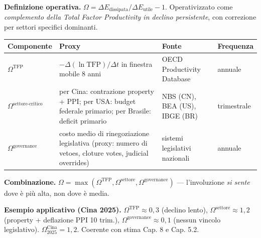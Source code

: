 \Hypoth{} \textbf{Definizione operativa.}
\(\Omega = \Delta E_{\text{dissipata}}/\Delta E_{\text{utile}} - 1\).
Operativizzato come \emph{complemento della Total Factor Productivity in
declino persistente}, con correzione per settori specifici dominanti.

{\def\LTcaptype{none} %
{\small\begin{longtable}[]{@{}
  >{\raggedright\arraybackslash}p{}
  >{\raggedright\arraybackslash}p{}
  >{\raggedright\arraybackslash}p{}
  >{\raggedright\arraybackslash}p{}@{}}
\toprule\noalign{}
\begin{minipage}[b]{\linewidth}\raggedright
Componente
\end{minipage} & \begin{minipage}[b]{\linewidth}\raggedright
Proxy
\end{minipage} & \begin{minipage}[b]{\linewidth}\raggedright
Fonte
\end{minipage} & \begin{minipage}[b]{\linewidth}\raggedright
Frequenza
\end{minipage} \\
\midrule\noalign{}
\endhead
\bottomrule\noalign{}
\endlastfoot
\(\Omega^{\text{TFP}}\) & \(-\Delta(\ln \text{TFP})/\Delta t\) in
finestra mobile 8 anni & OECD Productivity Database & annuale \\
\(\Omega^{\text{settore-critico}}\) & per Cina: contrazione property +
PPI; per USA: budget federale primario; per Brasile: deficit primario &
NBS (CN), BEA (US), IBGE (BR) & trimestrale \\
\(\Omega^{\text{governance}}\) & costo medio di rinegoziazione
legislativa (proxy: numero di vetoes, cloture votes, judicial overrides)
& sistemi legislativi nazionali & annuale \\
\end{longtable}}
}

\Proved{} \textbf{Combinazione.}
\(\Omega = \max(\Omega^{\text{TFP}}, \Omega^{\text{settore}}, \Omega^{\text{governance}})\)
--- l'involuzione \emph{si sente} dove è più alta, non dove è media.

\Hypoth{} \textbf{Esempio applicativo (Cina 2025).}
\(\Omega^{\text{TFP}} \approx 0{,}3\) (declino lento),
\(\Omega^{\text{settore}} \approx 1{,}2\) (property + deflazione PPI 10
trim.), \(\Omega^{\text{governance}} \approx 0{,}1\) (nessun vincolo
legislativo). \(\Omega^{\text{Cina}}_{2025} = 1{,}2\). Coerente con
stima Cap. 8 e Cap. 5.2.



